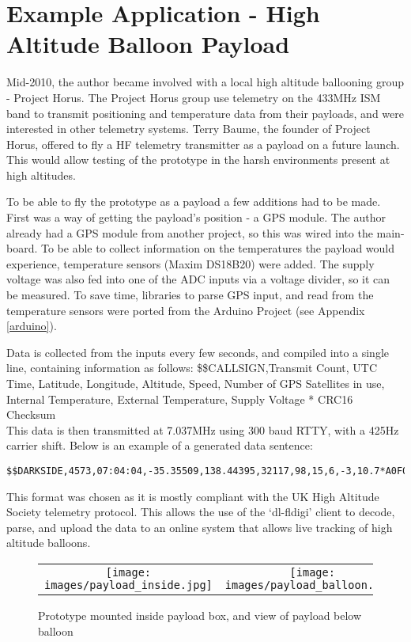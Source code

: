 \documentclass[a4paper,12pt]{article}
\begin{document}
\section{Example Application - High Altitude Balloon Payload}
Mid-2010, the author became involved with a local high altitude ballooning group - Project Horus. The Project Horus group use telemetry on the 433MHz ISM band to transmit positioning and temperature data from their payloads, and were interested in other telemetry systems. Terry Baume, the founder of Project Horus, offered to fly a HF telemetry transmitter as a payload on a future launch. This would allow testing of the prototype in the harsh environments present at high altitudes. 

To be able to fly the prototype as a payload a few additions had to be made. First was a way of getting the payload's position - a GPS module. The author already had a GPS module from another project, so this was wired into the main-board. To be able to collect information on the temperatures the payload would experience, temperature sensors (Maxim DS18B20) were added. The supply voltage was also fed into one of the ADC inputs via a voltage divider, so it can be measured. To save time, libraries to parse GPS input, and read from the temperature sensors were ported from the Arduino Project (see Appendix \ref{arduino}).

Data is collected from the inputs every few seconds, and compiled into a single line, containing information as follows:
\$\$CALLSIGN,Transmit Count, UTC Time, Latitude, Longitude, Altitude, Speed, Number of GPS Satellites in use, Internal Temperature, External Temperature, Supply Voltage * CRC16 Checksum\\
This data is then transmitted at 7.037MHz using 300 baud RTTY, with a 425Hz carrier shift.
Below is an example of a generated data sentence:
\begin{verbatim}
$$DARKSIDE,4573,07:04:04,-35.35509,138.44395,32117,98,15,6,-3,10.7*A0F0
\end{verbatim}

This format was chosen as it is mostly compliant with the UK High Altitude Society telemetry protocol\citep{ref:ukhas}. This allows the use of the `dl-fldigi' client to decode, parse, and upload the data to an online system that allows live tracking of high altitude balloons.

\begin{figure}[h]
  \begin{center}
  \begin{tabular}{cc}
    \texttt{[image: images/payload\_inside.jpg]} &
    \texttt{[image: images/payload\_balloon.jpg]}\\
  \end{tabular}
  \end{center}
  \caption{Prototype mounted inside payload box, and view of payload below balloon}
  \label{fig:payload_inside}
\end{figure}
\end{document}
